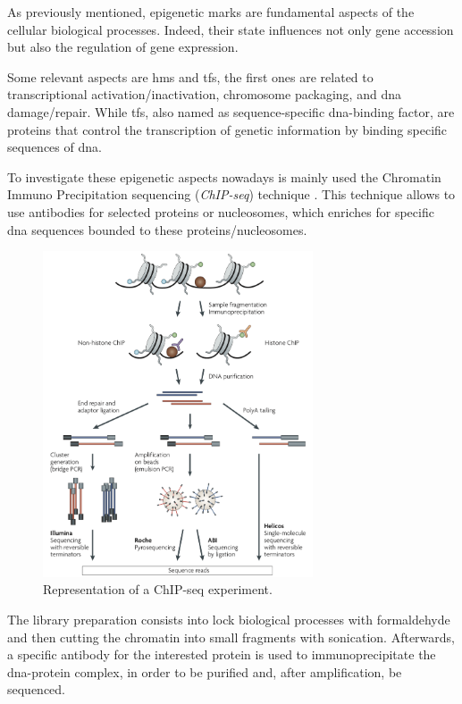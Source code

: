 As previously mentioned, epigenetic marks are fundamental aspects of the cellular biological processes. 
Indeed, their state influences not only gene accession but also the regulation of gene expression.

Some relevant aspects are \glspl{hm} and \glspl{tf}, the first ones are related to transcriptional activation/inactivation, chromosome packaging, and \gls{dna} damage/repair.
While \glspl{tf}, also named as sequence-specific \gls{dna}-binding factor, are proteins that control the transcription of genetic information by binding specific sequences of \gls{dna}.

To investigate these epigenetic aspects nowadays is mainly used the Chromatin Immuno Precipitation sequencing (\textit{ChIP-seq}) technique \cite{Park2009}.
This technique allows to use antibodies for selected proteins or nucleosomes, which enriches for specific \gls{dna} sequences bounded to these proteins/nucleosomes.

\begin{figure}[H]
\centering
\includegraphics[width=8cm, keepaspectratio]{img/intro/chip.png}
\caption[ChIP-seq experiment]{Representation of a  ChIP-seq experiment. \cite{Park2009}}
\label{fig:chipseqexp}
\end{figure}

The library preparation consists into lock biological processes with formaldehyde and then cutting the chromatin into small fragments with sonication.
Afterwards, a specific antibody for the interested protein is used to immunoprecipitate the \gls{dna}-protein complex, in order to be purified and, after amplification, be sequenced.

